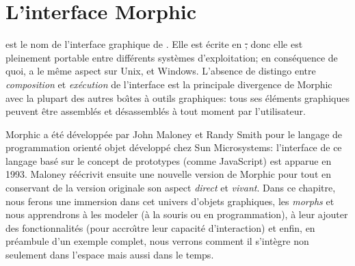 \documentclass[a4paper,10pt,twoside]{book}
\begin{document}
	\renewcommand{\nnbb}[2]{} %
	\sloppy
\fi
\chapter{L'interface Morphic}


%
 est le nom de l'interface graphique de \sq.
Elle est \'ecrite en \st, donc elle est pleinement portable entre
diff\'erents syst\`emes d'exploitation; en cons\'equence de quoi, \sq
a le m\^eme aspect sur Unix, \macosx et Windows.
L'absence de distingo entre \emph{composition} et \emph{ex\'ecution}
de l'interface est la principale divergence de Morphic avec la plupart
des autres bo\^{\i}tes \`a outils graphiques: tous ses \'el\'ements
graphiques peuvent \^etre assembl\'es et d\'esassembl\'es \`a tout
moment par l'utilisateur.



Morphic a \'et\'e d\'evelopp\'ee par John Maloney et Randy Smith pour
le langage de programmation orient\'e objet  d\'evelopp\'e
chez Sun Microsystems:
l'interface de ce langage bas\'e sur le concept de prototypes (comme
JavaScript) est apparue en 1993.
Maloney r\'e\'ecrivit ensuite une nouvelle version de Morphic pour
\sq tout en conservant de la version originale son aspect 
\emph{direct} et 
\emph{vivant}.
Dans ce chapitre, nous ferons une immersion dans cet univers d'objets
graphiques, les \emph{morphs} et nous apprendrons \`a les modeler (\`a la
souris ou en programmation), \`a leur ajouter des fonctionnalit\'es (pour
accro\^{\i}tre leur capacit\'e d'interaction) et enfin, en pr\'eambule
d'un exemple complet, nous verrons comment il s'int\`egre non seulement
dans l'espace mais aussi dans le temps.
\end{document}
